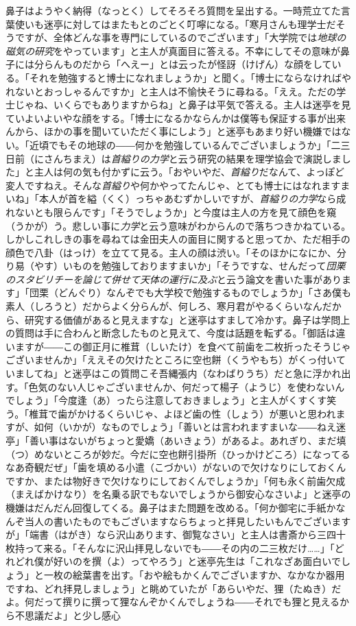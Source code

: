 \documentclass{book}
\begin{document}
鼻子はようやく納得（なっとく）してそろそろ質問を呈出する。一時荒立てた言葉使いも迷亭に対してはまたもとのごとく叮嚀になる。「寒月さんも理学士だそうですが、全体どんな事を専門にしているのでございます」「大学院では\emph{地球の磁気の研究}をやっています」と主人が真面目に答える。不幸にしてその意味が鼻子には分らんものだから「へえー」とは云ったが怪訝（けげん）な顔をしている。「それを勉強すると博士になれましょうか」と聞く。「博士にならなければやれないとおっしゃるんですか」と主人は不愉快そうに尋ねる。「ええ。ただの学士じゃね、いくらでもありますからね」と鼻子は平気で答える。主人は迷亭を見ていよいよいやな顔をする。「博士になるかならんかは僕等も保証する事が出来んから、ほかの事を聞いていただく事にしよう」と迷亭もあまり好い機嫌ではない。「近頃でもその地球の――何かを勉強しているんでございましょうか」「二三日前（にさんちまえ）は\emph{首縊りの力学}と云う研究の結果を理学協会で演説しました」と主人は何の気も付かずに云う。「おやいやだ、\emph{首縊り}だなんて、よっぽど変人ですねえ。そんな\emph{首縊り}や何かやってたんじゃ、とても博士にはなれますまいね」「本人が首を縊（くく）っちゃあむずかしいですが、\emph{首縊りの力学}なら成れないとも限らんです」「そうでしょうか」と今度は主人の方を見て顔色を窺（うかが）う。悲しい事に\emph{力学}と云う意味がわからんので落ちつきかねている。しかしこれしきの事を尋ねては金田夫人の面目に関すると思ってか、ただ相手の顔色で八卦（はっけ）を立てて見る。主人の顔は渋い。「そのほかになにか、分り易（やす）いものを勉強しておりますまいか」「そうですな、せんだって\emph{団栗のスタビリチーを論じて併せて天体の運行に及ぶ}と云う論文を書いた事があります」「団栗（どんぐり）なんぞでも大学校で勉強するものでしょうか」「さあ僕も素人（しろうと）だからよく分らんが、何しろ、寒月君がやるくらいなんだから、研究する価値があると見えますな」と迷亭はすまして冷かす。鼻子は学問上の質問は手に合わんと断念したものと見えて、今度は話題を転ずる。「御話は違いますが――この御正月に椎茸（しいたけ）を食べて前歯を二枚折ったそうじゃございませんか」「ええその欠けたところに空也餅（くうやもち）がくっ付いていましてね」と迷亭はこの質問こそ吾縄張内（なわばりうち）だと急に浮かれ出す。「色気のない人じゃございませんか、何だって楊子（ようじ）を使わないんでしょう」「今度逢（あ）ったら注意しておきましょう」と主人がくすくす笑う。「椎茸で歯がかけるくらいじゃ、よほど歯の性（しょう）が悪いと思われますが、如何（いかが）なものでしょう」「善いとは言われますまいな――ねえ迷亭」「善い事はないがちょっと愛嬌（あいきょう）があるよ。あれぎり、まだ填（つ）めないところが妙だ。今だに空也餅引掛所（ひっかけどころ）になってるなあ奇観だぜ」「歯を填める小遣（こづかい）がないので欠けなりにしておくんですか、または物好きで欠けなりにしておくんでしょうか」「何も永く前歯欠成（まえばかけなり）を名乗る訳でもないでしょうから御安心なさいよ」と迷亭の機嫌はだんだん回復してくる。鼻子はまた問題を改める。「何か御宅に手紙かなんぞ当人の書いたものでもございますならちょっと拝見したいもんでございますが」「端書（はがき）なら沢山あります、御覧なさい」と主人は書斎から三四十枚持って来る。「そんなに沢山拝見しないでも――その内の二三枚だけ\ldots{}\ldots{}」「どれどれ僕が好いのを撰（よ）ってやろう」と迷亭先生は「これなざあ面白いでしょう」と一枚の絵葉書を出す。「おや絵もかくんでございますか、なかなか器用ですね、どれ拝見しましょう」と眺めていたが「あらいやだ、狸（たぬき）だよ。何だって撰りに撰って狸なんぞかくんでしょうね――それでも狸と見えるから不思議だよ」と少し感心
\end{document}
